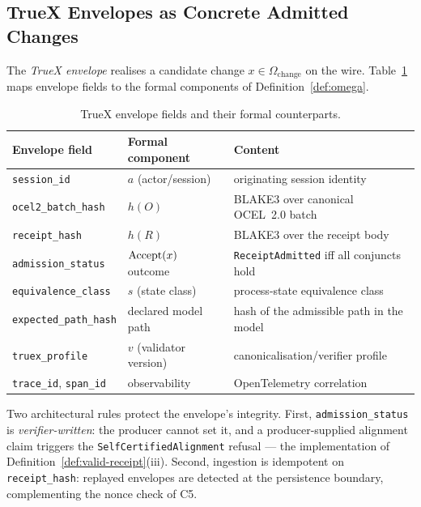 \subsection{TrueX Envelopes as Concrete Admitted Changes}
\label{sec:impl-truex}

The \emph{TrueX envelope} realises a candidate change
$x \in \Omega_{\mathrm{change}}$ on the wire.
Table~\ref{tab:envelope} maps envelope fields to the formal components of
Definition~\ref{def:omega}.

\begin{table}[t]
\centering
\caption{TrueX envelope fields and their formal counterparts.}
\label{tab:envelope}
\begin{tabularx}{\textwidth}{llX}
\toprule
\textbf{Envelope field} & \textbf{Formal component} & \textbf{Content}\\
\midrule
\texttt{session\_id}          & $a$ (actor/session)     & originating session identity\\
\texttt{ocel2\_batch\_hash}   & $h(O)$                  & BLAKE3 over canonical OCEL~2.0 batch\\
\texttt{receipt\_hash}        & $h(R)$                  & BLAKE3 over the receipt body\\
\texttt{admission\_status}    & $\operatorname{Accept}(x)$ outcome    & \texttt{ReceiptAdmitted} iff all conjuncts hold\\
\texttt{equivalence\_class}   & $s$ (state class)       & process-state equivalence class\\
\texttt{expected\_path\_hash} & declared model path     & hash of the admissible path in the model\\
\texttt{truex\_profile}       & $v$ (validator version) & canonicalisation/verifier profile\\
\texttt{trace\_id}, \texttt{span\_id} & observability   & OpenTelemetry correlation\\
\bottomrule
\end{tabularx}
\end{table}

Two architectural rules protect the envelope's integrity. First,
\texttt{admission\_status} is \emph{verifier-written}: the producer cannot set
it, and a producer-supplied alignment claim triggers the
\texttt{SelfCertifiedAlignment} refusal --- the implementation of
Definition~\ref{def:valid-receipt}(iii). Second, ingestion is idempotent on
\texttt{receipt\_hash}: replayed envelopes are detected at the persistence
boundary, complementing the nonce check of C5.

